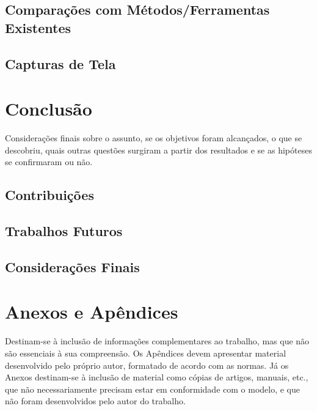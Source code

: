 \documentclass[openright]{ifrs} %
\begin{document}
\section{Comparações com Métodos/Ferramentas Existentes}
\section{Capturas de Tela}

\chapter{Conclusão}
Considerações finais sobre o assunto, se os objetivos foram alcançados, o que se descobriu, quais outras questões surgiram a partir dos resultados e se as hipóteses se confirmaram ou não.
\section{Contribuições}
\section{Trabalhos Futuros}
\section{Considerações Finais}



\appendix

\chapter{Anexos e Apêndices}
Destinam-se à inclusão de informações complementares ao trabalho, mas que não são essenciais à sua compreensão. Os Apêndices devem apresentar material desenvolvido pelo próprio autor, formatado de acordo com as normas. Já os Anexos destinam-se à inclusão de material como cópias de artigos, manuais, etc., que não necessariamente precisam estar em conformidade com o modelo, e que não foram desenvolvidos pelo autor do trabalho.


\end{document}
